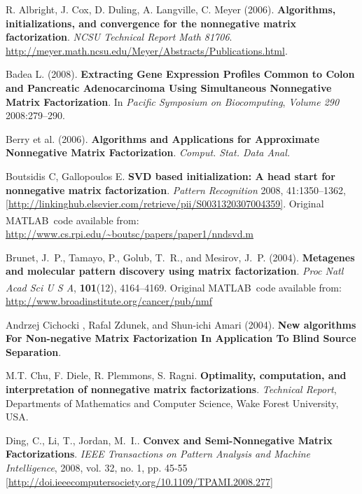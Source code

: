 \documentclass[a4paper]{article}
\newcommand{\MATLAB}{MATLAB\textsuperscript{\textregistered}\ }
\begin{document}
\begin{thebibliography}{}

 R. Albright, J. Cox, D. Duling, A. Langville, C. Meyer (2006).
\textbf{Algorithms, initializations, and convergence for the nonnegative matrix factorization}.
{\it NCSU Technical Report Math 81706}. \url{http://meyer.math.ncsu.edu/Meyer/Abstracts/Publications.html}.

 Badea L. (2008). 
\textbf{Extracting Gene Expression Profiles Common to Colon and Pancreatic Adenocarcinoma Using Simultaneous Nonnegative Matrix Factorization}.
In \emph{Pacific Symposium on Biocomputing}, \emph{Volume 290} 2008:279--290.

 Berry et al. (2006).
\textbf{Algorithms and Applications for Approximate Nonnegative Matrix Factorization}.
{\it Comput. Stat. Data Anal.}

Boutsidis C, Gallopoulos E.
\textbf{SVD based initialization: A head start for nonnegative matrix factorization}.
\emph{Pattern Recognition} 2008, 41:1350--1362,
\url{[http://linkinghub.elsevier.com/retrieve/pii/S0031320307004359]}.
Original \MATLAB code available from: \url{http://www.cs.rpi.edu/~boutsc/papers/paper1/nndsvd.m}

 Brunet, J.~P., Tamayo, P., Golub, T.~R., and Mesirov, J.~P. (2004).
\textbf{Metagenes and molecular pattern discovery using matrix factorization}.
{\em Proc Natl Acad Sci U S A\/}, {\bf 101}(12), 4164--4169.
Original \MATLAB code available from: \url{http://www.broadinstitute.org/cancer/pub/nmf}

 Andrzej Cichocki , Rafal Zdunek, and Shun-ichi Amari (2004).
\textbf{New algorithms For Non-negative Matrix Factorization In Application To Blind Source Separation}.

 M.T. Chu, F. Diele, R. Plemmons, S. Ragni.
\textbf{Optimality, computation, and interpretation of nonnegative matrix factorizations}.
{\it Technical Report}, Departments of Mathematics and Computer Science, Wake Forest University, USA.

 Ding, C., Li, T., Jordan, M.~I..
\textbf{Convex and Semi-Nonnegative Matrix Factorizations}.
\emph{IEEE Transactions on Pattern Analysis and Machine Intelligence}, 2008, vol. 32, no. 1, pp. 45-55
\url{[http://doi.ieeecomputersociety.org/10.1109/TPAMI.2008.277]}


\end{thebibliography}
\end{document}
